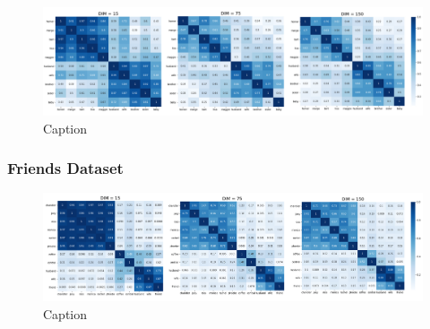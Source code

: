 \begin{figure}[H]
    \centering
    \includegraphics[width=\textwidth]{doc/images/simpsons_sim_matrix.png}
    \caption{Caption}
    \label{fig:simpsons_sim_matrix}
\end{figure}

\subsubsection{Friends Dataset}

\begin{figure}[H]
    \centering
    \includegraphics[width=\textwidth]{doc/images/friends_sim_matrix.png}
    \caption{Caption}
    \label{fig:friends_sim_matrix}
\end{figure}